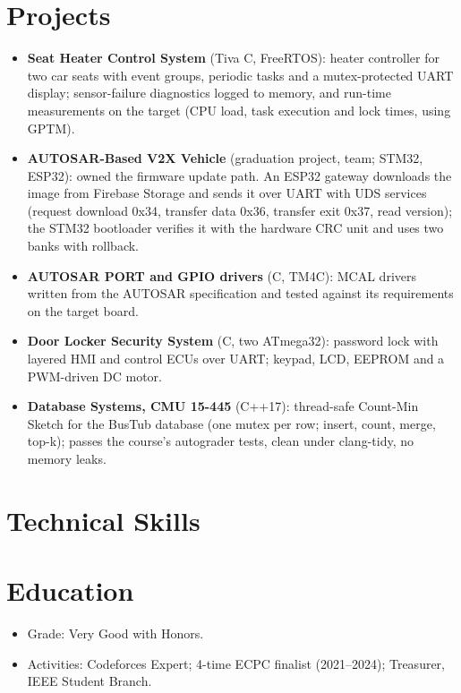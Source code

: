 \documentclass[10pt]{article}
\begin{document}
\section*{Projects}
\begin{itemize}
  \item \textbf{Seat Heater Control System} (Tiva C, FreeRTOS): heater controller for two car seats with event groups, periodic tasks and a mutex-protected UART display; sensor-failure diagnostics logged to memory, and run-time measurements on the target (CPU load, task execution and lock times, using GPTM). 
  \item \textbf{AUTOSAR-Based V2X Vehicle} (graduation project, team; STM32, ESP32): owned the firmware update path. An ESP32 gateway downloads the image from Firebase Storage and sends it over UART with UDS services (request download 0x34, transfer data 0x36, transfer exit 0x37, read version); the STM32 bootloader verifies it with the hardware CRC unit and uses two banks with rollback. 
  \item \textbf{AUTOSAR PORT and GPIO drivers} (C, TM4C): MCAL drivers written from the AUTOSAR specification and tested against its requirements on the target board.
  \item \textbf{Door Locker Security System} (C, two ATmega32): password lock with layered HMI and control ECUs over UART; keypad, LCD, EEPROM and a PWM-driven DC motor. 
  \item \textbf{Database Systems, CMU 15-445} (C++17): thread-safe Count-Min Sketch for the BusTub database (one mutex per row; insert, count, merge, top-k); passes the course's autograder tests, clean under clang-tidy, no memory leaks. 
\end{itemize}

\section*{Technical Skills}

\section*{Education}
\begin{itemize}
  \item Grade: Very Good with Honors.
  \item Activities: Codeforces Expert; 4-time ECPC finalist (2021--2024); Treasurer, IEEE Student Branch.
\end{itemize}
\end{document}
